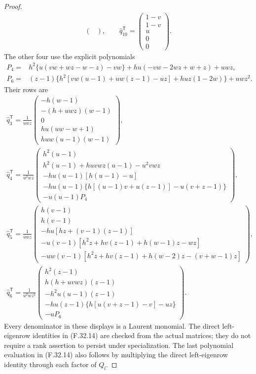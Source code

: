 \begin{proof}
\[\begin{gathered}
\begin{pmatrix}
 \end{pmatrix},\qquad
 \widehat q_{10}^{\mathsf T}=
                 \begin{pmatrix}1-v\\1-v\\u\\0\\0\end{pmatrix}.
 \end{gathered}                                                \tag{F.32.15}
\]
The other four use the explicit
polynomials
\[
 \begin{aligned}
 P_4={}&h^2\{u(vw+wz-w-z)-vw\}
                  +hu(-vw-2wz+w+z)+uwz,\\
 P_6={}&(z-1)\{h^2[vw(u-1)+uw(z-1)-uz]
                         +huz(1-2w)\}+uwz^2.
 \end{aligned}                                                \tag{F.32.16}
\]
Their rows are
\[
 \begin{gathered}
 \widehat q_3^{\mathsf T}=\frac1{uwz}
 \begin{pmatrix}
 -h(w-1)\\-(h+uwz)(w-1)\\0\\hu(uw-w+1)\\huw(u-1)(w-1)
 \end{pmatrix},\\
 \widehat q_4^{\mathsf T}=\frac1{u^2wz}
 \begin{pmatrix}
 h^2(u-1)\\
 h^2(u-1)+huv wz(u-1)-u^2v wz\\
 -hu(u-1)[h(u-1)-u]\\
 -hu(u-1)\{h[(u-1)v+u(z-1)]-u(v+z-1)\}\\
 -u(u-1)P_4
 \end{pmatrix},\\
 \widehat q_5^{\mathsf T}=\frac1{uwz}
 \begin{pmatrix}
 h(v-1)\\h(v-1)\\-hu[hz+(v-1)(z-1)]\\
 -u(v-1)[h^2z+hv(z-1)+h(w-1)z-wz]\\
 -uw(v-1)[h^2z+hv(z-1)+h(w-2)z-(v+w-1)z]
 \end{pmatrix},\\
 \widehat q_6^{\mathsf T}=\frac1{u^2wz^2}
 \begin{pmatrix}
 h^2(z-1)\\h(h+uv wz)(z-1)\\-h^2u(u-1)(z-1)\\
 -hu(z-1)\{h[u(v+z-1)-v]-uz\}\\-uP_6
 \end{pmatrix}.
 \end{gathered}                                                \tag{F.32.17}
\]
Every denominator in these displays
is a Laurent monomial. The direct
left-eigenrow identities in (F.32.14)
are checked from the actual matrices;
they do not require a rank assertion
to persist under specialization.
The last polynomial evaluation in
(F.32.14) also follows by multiplying
the direct left-eigenrow identity
through each factor of $Q_l$.


\end{proof}
